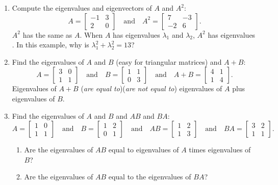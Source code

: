 \documentclass[14pt, a4paper]{article}
\begin{document}
\begin{enumerate}
    \item Compute the eigenvalues and eigenvectors of $A$ and $A^2$:
          \[
              A = \begin{bmatrix} -1 & 3 \\ 2 & 0 \end{bmatrix} \quad \text{and} \quad A^2 = \begin{bmatrix} 7 & -3 \\ -2 & 6 \end{bmatrix} .
          \]
          $A^2$ has the same \underline{\hspace{1cm}} as $A$. When $A$ has eigenvalues $\lambda_1$ and $\lambda_2$, $A^2$ has eigenvalues \underline{\hspace{1cm}} . In this example, why is $\lambda_1^2 + \lambda_2^2 = 13$?

    \item Find the eigenvalues of $A$ and $B$ (easy for triangular matrices) and $A + B$:
          \[
              A = \begin{bmatrix} 3 & 0 \\ 1 & 1 \end{bmatrix} \quad \text{and} \quad B = \begin{bmatrix} 1 & 1 \\ 0 & 3 \end{bmatrix} \quad \text{and} \quad A + B = \begin{bmatrix} 4 & 1 \\ 1 & 4 \end{bmatrix} .
          \]
          Eigenvalues of $A + B$ (\textit{are equal to})(\textit{are not equal to}) eigenvalues of $A$ plus eigenvalues of $B$.

    \item Find the eigenvalues of $A$ and $B$ and $AB$ and $BA$:
          \[
              A = \begin{bmatrix} 1 & 0 \\ 1 & 1 \end{bmatrix} \quad \text{and} \quad B = \begin{bmatrix} 1 & 2 \\ 0 & 1 \end{bmatrix} \quad \text{and} \quad AB = \begin{bmatrix} 1 & 2 \\ 1 & 3 \end{bmatrix} \quad \text{and} \quad BA = \begin{bmatrix} 3 & 2 \\ 1 & 1 \end{bmatrix} .
          \]
          \begin{enumerate}
              \item Are the eigenvalues of $AB$ equal to eigenvalues of $A$ times eigenvalues of $B$?
              \item Are the eigenvalues of $AB$ equal to the eigenvalues of $BA$?
          \end{enumerate}


\end{enumerate}
\end{document}
